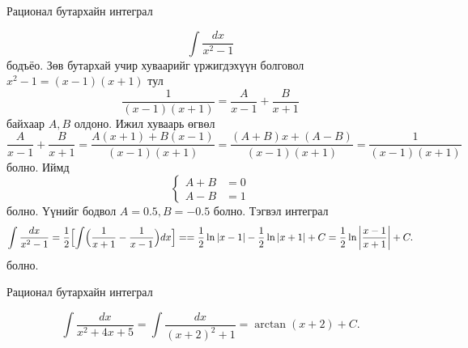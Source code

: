 \begin{frame}[allowframebreaks]{Рационал бутархайн интеграл}
\begin{example}
\[
\int \frac{dx}{x^2-1}
\]
бодъёо. Зөв бутархай учир хуваарийг үржигдэхүүн болговол ${x^2-1}=(x-1)(x+1)$ тул
\[
\frac{1}{(x-1)(x+1)}=\frac{A}{x-1}+\frac{B}{x+1}
\]
 байхаар $A, B$ олдоно. Ижил хуваарь өгвөл 
 \[
\frac{A}{x-1}+\frac{B}{x+1}=\frac{A(x+1)+B(x-1)}{(x-1)(x+1)}=\frac{(A+B)x+(A-B)}{(x-1)(x+1)}=\frac{1}{(x-1)(x+1)}
\] болно. Иймд 
$$
\begin{cases}
    A+B&=0\\
    A-B&=1
\end{cases}$$ болно. Үүнийг бодвол $A=0.5, B=-0.5$ болно. 
Тэгвэл интеграл
\[
\int \frac{dx}{x^2-1}=\frac12\Bigl[\int \Bigl(\dfrac{1}{x+1}-\dfrac{1}{x-1}\Bigr)dx\Bigr]==\frac12\ln|x-1|-\frac12\ln|x+1|+C
=\frac12\ln\left|\frac{x-1}{x+1}\right|+C.
\]
 болно.
\end{example}
\end{frame}

\begin{frame}[allowframebreaks]{Рационал бутархайн интеграл}
\begin{example}
 \[
\int \frac{dx}{x^2+4x+5}
=
\int \frac{dx}{(x+2)^2+1}
=
\arctan(x+2)+C.
\]   
\end{example}
\end{frame}


